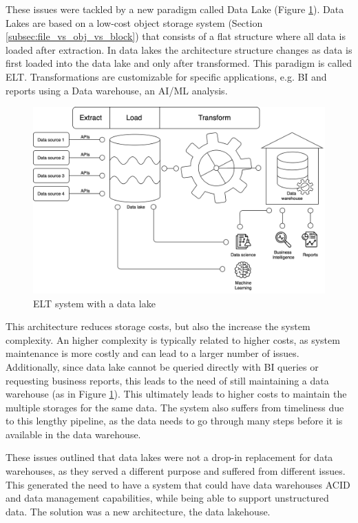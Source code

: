 These issues were tackled by a new paradigm called Data Lake (Figure \ref{fig:ELT+DL}). Data Lakes are based on a low-cost object storage system (Section \ref{subsec:file_vs_obj_vs_block}) that consists of a flat structure where all data is loaded after extraction. In data lakes the architecture structure changes as data is first loaded into the data lake and only after transformed. This paradigm is called \gls{ELT}. Transformations are customizable for specific applications, e.g. \gls{BI} and reports using a Data warehouse, an \gls{AI}/\gls{ML} analysis.

\begin{figure}[!ht]
    \begin{center}
      \includegraphics[width=\textwidth]{figures/2-background/DeltaLake_evolution-ELT+DL.png}
    \end{center}
    \caption{\gls{ELT} system with a data lake}
    \label{fig:ELT+DL}
\end{figure}

This architecture reduces storage costs, but also the increase the system complexity. An higher complexity is typically related to higher costs, as system maintenance is more costly and can lead to a larger number of issues. Additionally, since data lake cannot be queried directly with \gls{BI} queries or requesting business reports, this leads to the need of still maintaining a data warehouse (as in Figure \ref{fig:ELT+DL}). This ultimately leads to higher costs to maintain the multiple storages for the same data. The system also suffers from timeliness due to this lengthy pipeline, as the data needs to go through many steps before it is available in the data warehouse. 

These issues outlined that data lakes were not a drop-in replacement for data warehouses, as they served a different purpose and suffered from different issues. This generated the need to have a system that could have data warehouses \gls{ACID} and data management capabilities, while being able to support unstructured data. The solution was a new architecture, the data lakehouse. 

